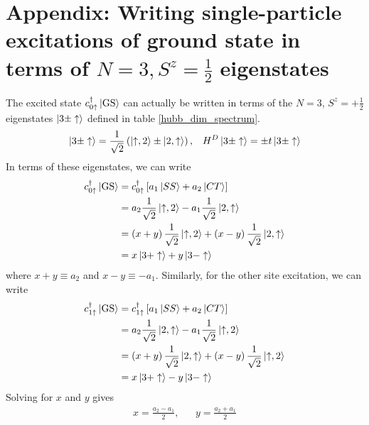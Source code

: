 \documentclass[12pt]{article}
\numberwithin{equation}{section}
\begin{document}
\section{Appendix: Writing single-particle excitations of ground state in terms of $N=3, S^z = \frac{1}{2}$ eigenstates}
The excited state $c^\dagger_{0\uparrow}\ket{\text{GS}}$ can actually be written in terms of the $N=3$, $S^z = + \frac{1}{2}$ eigenstates $\ket{3\pm\uparrow}$ defined in table \ref{hubb_dim_spectrum}.
\begin{equation}\begin{aligned}
	\ket{3\pm \uparrow} = \frac{1}{\sqrt 2}\left(\ket{\uparrow, 2} \pm \ket{2, \uparrow}\right), && H^D \ket{3\pm \uparrow} = \pm t\ket{3\pm \uparrow}
\end{aligned}\end{equation}
In terms of these eigenstates, we can write
\begin{equation}\begin{aligned}
	c^\dagger_{0\uparrow}\ket{\text{GS}} 
	&= c^\dagger_{0\uparrow}\left[a_1 \ket{SS} + a_2 \ket{CT}\right] \\
	&= a_2 \frac{1}{\sqrt 2}\ket{\uparrow,2} - a_1 \frac{1}{\sqrt 2}\ket{2, \uparrow}\\
	&= \left(x + y\right) \frac{1}{\sqrt 2}\ket{\uparrow,2} + \left(x - y\right) \frac{1}{\sqrt 2}\ket{2, \uparrow}\\
	&=x\ket{3+ \uparrow} + y\ket{3- \uparrow}
\end{aligned}\end{equation}
where $x + y \equiv a_2$ and $x-y \equiv -a_1$. Similarly, for the other site excitation, we can write
\begin{equation}\begin{aligned}
	c^\dagger_{1\uparrow}\ket{\text{GS}} 
	&= c^\dagger_{1\uparrow}\left[a_1 \ket{SS} + a_2 \ket{CT}\right] \\
	&= a_2 \frac{1}{\sqrt 2}\ket{2, \uparrow} - a_1 \frac{1}{\sqrt 2}\ket{\uparrow, 2}\\
	&=  \left(x + y\right) \frac{1}{\sqrt 2}\ket{2, \uparrow} + \left(x - y\right) \frac{1}{\sqrt 2}\ket{\uparrow, 2}\\
	&=x\ket{3+ \uparrow} - y\ket{3- \uparrow}
\end{aligned}\end{equation}
Solving for $x$ and $y$ gives
\begin{equation}\begin{aligned}
	x = \frac{a_2 - a_1}{2}, && y = \frac{a_2 + a_1}{2}
\end{aligned}\end{equation}
\end{document}
